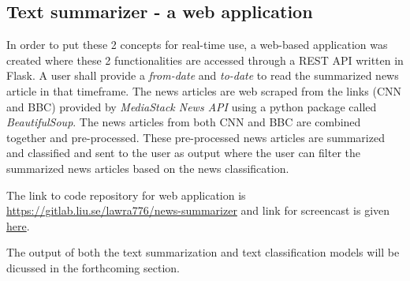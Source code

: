 \documentclass[a4paper,4pt]{article}
\begin{document}
\subsection{Text summarizer - a web application}
In order to put these 2 concepts for real-time use, a web-based application was created where these 2 functionalities are accessed 
through a REST API written in Flask. A user shall provide a \textit{from-date} and \textit{to-date} to read the summarized news 
article in that timeframe. The news articles are web scraped from the links (CNN and BBC) provided by \textit{MediaStack News API} 
using a python package called \textit{BeautifulSoup}. The news articles from both CNN and BBC are combined together and pre-processed.
These pre-processed news articles are summarized and classified and sent to the user as output where the user can filter the summarized
news articles based on the news classification. \\
\par The link to code repository for web application is \href{https://gitlab.liu.se/lawra776/news-summarizer}
{https://gitlab.liu.se/lawra776/news-summarizer} and link for screencast is given \href{https://liuonline-my.sharepoint.com/:v:/r/personal/lawra776_student_liu_se/Documents/Lawra776-TDDE16-web-application-screencast.mp4?csf=1&web=1&e=UuwHev}
{here}. \\
\par
The output of both the text summarization and text classification models will be dicussed in the forthcoming section.
\end{document}

